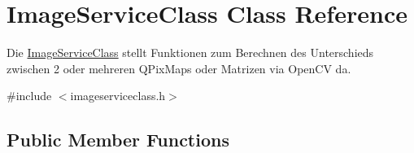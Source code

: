 \hypertarget{class_image_service_class}{}\section{Image\+Service\+Class Class Reference}
\label{class_image_service_class}


Die \hyperlink{class_image_service_class}{Image\+Service\+Class} stellt Funktionen zum Berechnen des Unterschieds zwischen 2 oder mehreren Q\+Pix\+Maps oder Matrizen via Open\+C\+V da.  




{\ttfamily \#include $<$imageserviceclass.\+h$>$}

\subsection*{Public Member Functions}
